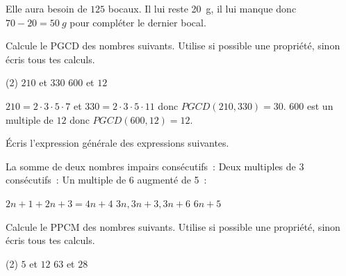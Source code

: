 \documentclass[parskip=half-,twoside=semi, DIV=12, 12pt]{scrartcl}
\begin{document}
\begin{soltransferer}
    \begin{tasks}
        \task {}
        \qquad Elle aura besoin de \(125\) bocaux.
        \task Il lui reste \SI{20}{g}, il lui manque donc \(70-20=\SI{50}{g}\) pour  compléter le dernier bocal.
    \end{tasks}
\end{soltransferer}
\begin{appliquer}[points=4]
    Calcule le PGCD des nombres suivants. Utilise si possible une propriété, sinon écris tous tes calculs.
    \begin{tasks}(2)
        \task \(210\) et \(330\)
        \task \(600\) et \(12\)
    \end{tasks}
\end{appliquer}
\begin{solappliquer}
    \begin{tasks}
        \task \(210 = 2 \cdot 3 \cdot 5 \cdot 7\) et \(330 = 2 \cdot 3 \cdot 5 \cdot 11\) donc \(PGCD(210, 330) = 30\).
        \task \(600\) est un multiple de \(12\) donc \(PGCD(600,12) = 12\).
    \end{tasks}
    \newpage
\end{solappliquer}
\vfill
\begin{connaitre}[points=3]
    Écris l'expression générale des expressions suivantes.
    \begin{tasks}
        \task La somme de deux nombres impairs consécutifs~:
        \task Deux multiples de 3 consécutifs~:
        \task Un multiple de 6 augmenté de 5~:
    \end{tasks}
    \vspace{0.5cm}
\end{connaitre}
\begin{solconnaitre}
    \begin{tasks}
        \task \(2n+1 + 2n + 3 = 4n  + 4\)
        \task \(3n, 3n+3, 3n+6\)
        \task \(6n+5\)
    \end{tasks}
\end{solconnaitre}
\newpage
\begin{appliquer}[points=4]
    Calcule le PPCM des nombres suivants. Utilise si possible une propriété, sinon écris tous tes calculs.
    \begin{tasks}[after-skip=5cm](2)
        \task \(5\) et \(12\)
        \task \(63\) et \(28\)
    \end{tasks}
\end{appliquer}
\end{document}

